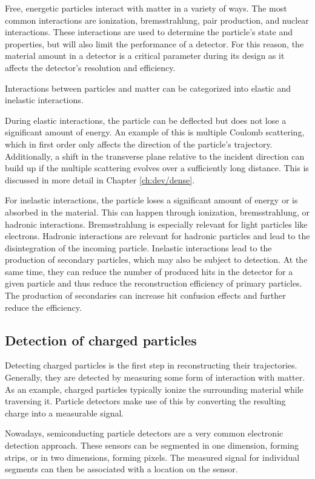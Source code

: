 Free, energetic particles interact with matter in a variety of ways. The most common interactions are ionization, bremsstrahlung, pair production, and nuclear interactions. These interactions are used to determine the particle's state and properties, but will also limit the performance of a detector. For this reason, the material amount in a detector is a critical parameter during its design as it affects the detector's resolution and efficiency.

Interactions between particles and matter can be categorized into elastic and inelastic interactions.

During elastic interactions, the particle can be deflected but does not lose a significant amount of energy. An example of this is multiple Coulomb scattering, which in first order only affects the direction of the particle's trajectory. Additionally, a shift in the transverse plane relative to the incident direction can build up if the multiple scattering evolves over a sufficiently long distance. This is discussed in more detail in Chapter \ref{ch:dev/dense}.

For inelastic interactions, the particle loses a significant amount of energy or is absorbed in the material. This can happen through ionization, bremsstrahlung, or hadronic interactions. Bremsstrahlung is especially relevant for light particles like electrons. Hadronic interactions are relevant for hadronic particles and lead to the disintegration of the incoming particle. Inelastic interactions lead to the production of secondary particles, which may also be subject to detection. At the same time, they can reduce the number of produced hits in the detector for a given particle and thus reduce the reconstruction efficiency of primary particles. The production of secondaries can increase hit confusion effects and further reduce the efficiency.

\subsection{Detection of charged particles}

Detecting charged particles is the first step in reconstructing their trajectories. Generally, they are detected by measuring some form of interaction with matter. As an example, charged particles typically ionize the surrounding material while traversing it. Particle detectors make use of this by converting the resulting charge into a measurable signal.

Nowadays, semiconducting particle detectors are a very common electronic detection approach. These sensors can be segmented in one dimension, forming strips, or in two dimensions, forming pixels. The measured signal for individual segments can then be associated with a location on the sensor.

